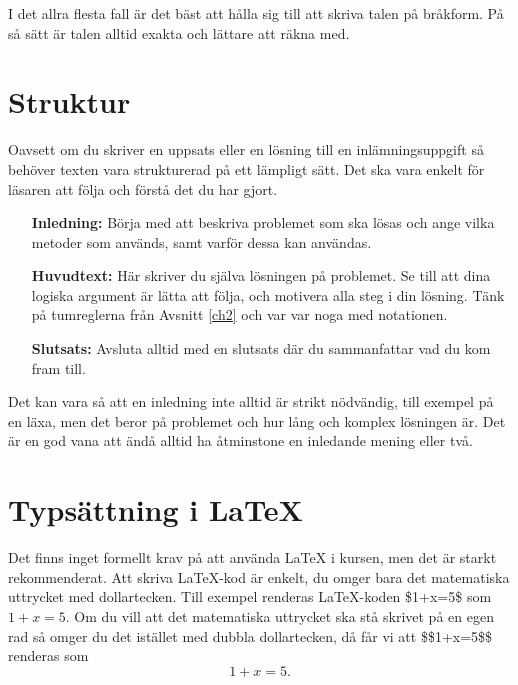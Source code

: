 \documentclass[titlepage]{article}
\begin{document}
I det allra flesta fall är det bäst att hålla sig till att skriva talen på bråkform. På så sätt är talen alltid exakta och lättare att räkna med.




\section{Struktur}

Oavsett om du skriver en uppsats eller en lösning till en inlämningsuppgift så behöver texten vara strukturerad på ett lämpligt sätt. Det ska vara enkelt för läsaren att följa och förstå det du har gjort. 

\begin{itemize}[leftmargin=25mm, rightmargin=0mm]
    \item[\textbf{Inledning:}] Börja med att beskriva problemet som ska lösas och ange vilka metoder som används, samt varför dessa kan användas.
    \item[\textbf{Huvudtext:}] Här skriver du själva lösningen på problemet. Se till att dina logiska argument är lätta att följa, och motivera alla steg i din lösning. Tänk på tumreglerna från Avsnitt \ref{ch2} och var var noga med notationen.
    \item[\textbf{Slutsats:}] Avsluta alltid med en slutsats där du sammanfattar vad du kom fram till.
\end{itemize}

Det kan vara så att en inledning inte alltid är strikt nödvändig, till exempel på en läxa, men det beror på problemet och hur lång och komplex lösningen är. Det är en god vana att ändå alltid ha åtminstone en inledande mening eller två.



\section{Typsättning i \LaTeX}

Det finns inget formellt krav på att använda \LaTeX$ $ i kursen, men det är starkt rekommenderat. Att skriva \LaTeX-kod är enkelt, du omger bara det matematiska uttrycket med dollartecken. Till exempel renderas \LaTeX-koden \$1+x=5\$ som $1+x=5$. Om du vill att det matematiska uttrycket ska stå skrivet på en egen rad så omger du det istället med dubbla dollartecken, då får vi att \$\$1+x=5\$\$ renderas som $$1+x=5.$$
\end{document}
